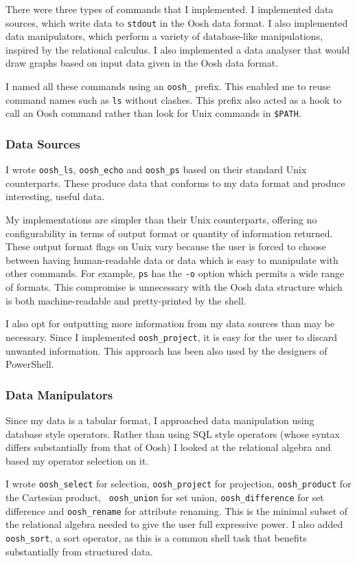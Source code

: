 \documentclass[12pt,twoside,notitlepage]{report}
\begin{document}
There were three types of commands that I implemented. I implemented data
sources, which write data to {\tt stdout} in the Oosh data format. I
also implemented data manipulators, which perform a variety of
database-like manipulations, inspired by the relational calculus. I
also implemented a data analyser that would draw graphs based on input
data given in the Oosh data format.

I named all these commands using an {\tt oosh\_} prefix. This enabled me
to reuse command names such as {\tt ls} without clashes. This
prefix also acted as a hook to call an Oosh command rather than look
for Unix commands in {\tt \$PATH}.

\subsubsection{Data Sources}
I wrote {\tt oosh\_ls}, {\tt oosh\_echo} and {\tt oosh\_ps} based on their
standard Unix counterparts. These produce data that conforms to my data
format and produce interesting, useful data. 

My implementations are simpler than their Unix counterparts, offering
no configurability in terms of output format or quantity of
information returned. These output format flags on Unix vary because
the user is forced to choose between having human-readable data or
data which is easy to manipulate with other commands. For example,
{\tt ps} has the {\tt -o} option which permits a wide range of
formats. This compromise is unnecessary with the Oosh data structure
which is both machine-readable and pretty-printed by the shell.

I also opt for outputting more information from my data sources than
may be necessary. Since I implemented {\tt oosh\_project}, it is easy
for the user to discard unwanted information. This approach has been
also used by the designers of PowerShell.

\subsubsection{Data Manipulators}
Since my data is a tabular format, I approached data manipulation
using database style operators. Rather than using SQL style operators
(whose syntax differs substantially from that of Oosh) I looked at the
relational algebra and based my operator selection on it.

I wrote {\tt oosh\_select} for selection, {\tt oosh\_project} for
projection, {\tt oosh\_product} for the Cartesian product, {\tt
  oosh\_union} for set union, {\tt oosh\_difference} for set
difference and {\tt oosh\_rename} for attribute renaming. This is the
minimal subset of the relational algebra needed to give the user full
expressive power. I also added {\tt oosh\_sort}, a sort operator, as
this is a common shell task that benefits substantially from
structured data.
\end{document}
